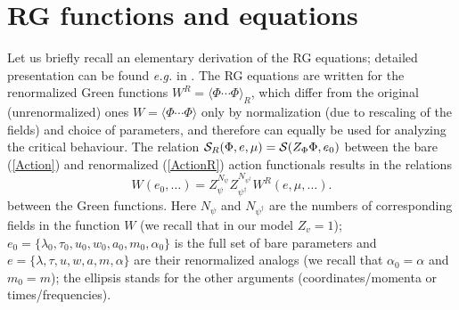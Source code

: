 \documentclass[12pt]{iopart}
\begin{document}
\section{RG functions and equations} \label{sec:RGE}

Let us briefly recall an elementary derivation of the RG equations;
detailed presentation can be found {\it e.g.} in \cite{Zinn,Book3}.
The RG equations are written for the renormalized Green functions
$W^{R} =\langle \Phi\cdots\Phi\rangle_{R}$, which differ from the
original (unrenormalized) ones $W =\langle
 \Phi\cdots\Phi\rangle$ only by
normalization (due to rescaling of the fields) and choice of
parameters, and therefore can equally be used for analyzing the
critical behaviour. The relation ${\cal S}_{R} (\Phi,e,\mu) =
{\cal S}(Z_{\Phi}\Phi,e_{0})$ between the bare (\ref{Action}) and
renormalized (\ref{ActionR}) action functionals results in the relations
\begin{equation}
W(e_{0},\dots) = Z_{\psi}^{N_{\psi}}
Z_{\psi^{\dagger}}^{N_{\psi^{\dagger}}} W^{R}(e,\mu,\dots).
\label{multi}
\end{equation}
between the Green functions. Here $N_{\psi}$ and
$N_{\psi^{\dagger}}$ are the numbers of corresponding fields
in the function $W$ (we recall that in our model $Z_{v}=1$);
$e_{0}=\{\lambda_{0}, \tau_{0}, u_{0}, w_{0}, a_{0}, m_{0},
\alpha_{0} \}$ is the full set of bare parameters and $e=\{
\lambda, \tau, u, w, a, m, \alpha  \}$ are their renormalized
analogs (we recall that $\alpha_{0}=\alpha$ and $m_{0}=m$);
the ellipsis stands for the other arguments (coordinates/momenta
or times/frequencies).
\end{document}
